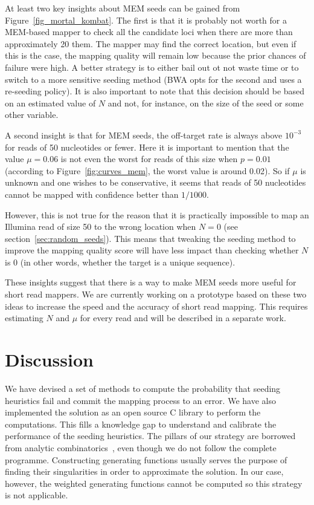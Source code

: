 \documentclass{article}
\begin{document}
At least two key insights about MEM seeds can be gained from
Figure~\ref{fig_mortal_kombat}. The first is that it is probably not worth
for a MEM-based mapper to check all the candidate loci when there are more
than approximately 20 them. The mapper may find the correct location, but
even if this is the case, the mapping quality will remain low because the
prior chances of failure were high. A better strategy is to either bail
out ot not waste time or to switch to a more sensitive seeding method (BWA
opts for the second and uses a re-seeding policy). It is also important
to note that this decision should be based on an estimated value of $N$
and not, for instance, on the size of the seed or some other variable.

A second insight is that for MEM seeds, the off-target rate is always
above $10^{-3}$ for reads of 50 nucleotides or fewer. Here it is important
to mention that the value $\mu=0.06$ is not even the worst for reads of
this size when $p=0.01$ (according to Figure~\ref{fig:curves_mem}, the
worst value is around 0.02). So if $\mu$ is unknown and one wishes to be
conservative, it seems that reads of 50 nucleotides cannot be mapped with
confidence better than $1/1000$.

However, this is not true for the reason that it is practically impossible
to map an Illumina read of size 50 to the wrong location when $N=0$ (see
section~\ref{sec:random_seeds}). This means that tweaking the seeding
method to improve the mapping quality score will have less impact than
checking whether $N$ is 0 (in other words, whether the target is a unique
sequence).

These insights suggest that there is a way to make MEM seeds more useful
for short read mappers. We are currently working on a prototype based on
these two ideas to increase the speed and the accuracy of short read
mapping. This requires estimating $N$ and $\mu$ for every read and will be
described in a separate work.


\section{Discussion}

We have devised a set of methods to compute the probability that seeding
heuristics fail and commit the mapping process to an error. We have also
implemented the solution as an open source C library to perform the
computations. This fills a knowledge gap to understand and calibrate the
performance of the seeding heuristics. The pillars of our strategy are
borrowed from analytic combinatorics~\cite{flajolet2009analytic,
sedgewick2013introduction}, even though we do not follow the complete
programme. Constructing generating functions usually serves the purpose of
finding their singularities in order to approximate the solution. In our
case, however, the weighted generating functions cannot be computed so
this strategy is not applicable.
\end{document}
